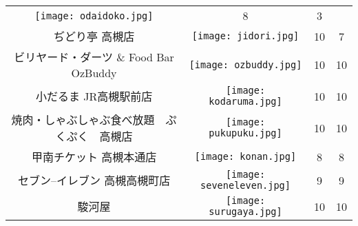 \begin{table}[t]
\begin{center}
\begin{tabular}{cc|cc}
\begin{minipage}{40mm}
          \texttt{[image: odaidoko.jpg]}
        \end{minipage} & 8 & 3 \\
        ぢどり亭 高槻店 & 
        \begin{minipage}{40mm}
          \centering
          \texttt{[image: jidori.jpg]}
        \end{minipage} & 10 & 7 \\
        ビリヤード・ダーツ \& Food Bar OzBuddy & 
        \begin{minipage}{40mm}
          \centering
          \texttt{[image: ozbuddy.jpg]}
        \end{minipage} & 10 & 10 \\
        小だるま JR高槻駅前店 &
        \begin{minipage}{40mm}
          \centering
          \texttt{[image: kodaruma.jpg]}
        \end{minipage} & 10 & 10 \\
        焼肉・しゃぶしゃぶ食べ放題　ぷくぷく　高槻店 & 
        \begin{minipage}{40mm}
          \centering
          \texttt{[image: pukupuku.jpg]}
        \end{minipage} & 10 & 10 \\
        甲南チケット 高槻本通店 & 
        \begin{minipage}{40mm}
          \centering
          \texttt{[image: konan.jpg]}
        \end{minipage} & 8 & 8 \\
        セブン--イレブン 高槻高槻町店 & 
        \begin{minipage}{40mm}
          \centering
          \texttt{[image: seveneleven.jpg]}
        \end{minipage} & 9 & 9 \\
        駿河屋 & 
        \begin{minipage}{40mm}
          \centering
          \texttt{[image: surugaya.jpg]}
        \end{minipage} & 10 & 10 \\
        \hline
      \end{tabular}
    \end{center}
  \end{table}
